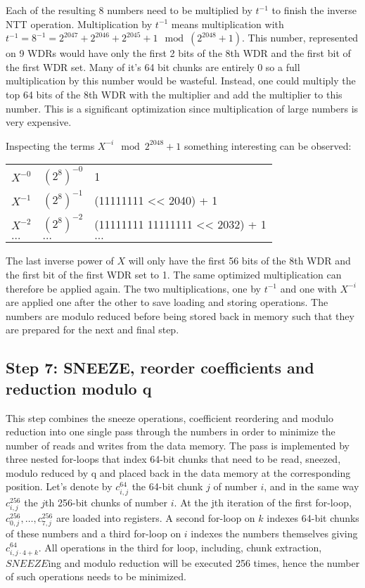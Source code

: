 Each of the resulting $8$ numbers need to be multiplied by $t^{-1}$ to finish the inverse NTT operation. Multiplication by $t^{-1}$ means multiplication with $t^{-1} = 8^{-1} = 2^{2047} + 2^{2046} + 2^{2045} + 1 \mod (2^{2048} + 1)$. This number, represented on 9 WDRs would have only the first 2 bits of the 8th WDR and the first bit of the first WDR set. Many of it's 64 bit chunks are entirely 0 so a full multiplication by this number would be wasteful. Instead, one could multiply the top 64 bits of the 8th WDR with the multiplier and add the multiplier to this number. This is a significant optimization since multiplication of large numbers is very expensive.

Inspecting the terms $X^{-i} \mod 2^{2048} + 1$ something interesting can be observed:

\begin{table*}[htpb]
    \caption[]{}
    \centering
    \begin{tabular}{l l l}
      \toprule
      \midrule
         $X^{-0}$ & $(2^8)^{-0}$  & 1 \\
         $X^{-1}$ & $(2^8)^{-1}$  & (11111111 << 2040) + 1 \\
         $X^{-2}$ & $(2^8)^{-2}$  & (11111111 11111111 << 2032) + 1 \\
         $\ldots$ & $\ldots$ & $\ldots$ \\
      \bottomrule
    \end{tabular}
  \end{table*}

The last inverse power of $X$ will only have the first 56 bits of the 8th WDR and the first bit of the first WDR set to 1. The same optimized multiplication can therefore be applied again. The two multiplications, one by $t^{-1}$ and one with $X^{-i}$ are applied one after the other to save loading and storing operations. The numbers are modulo reduced before being stored back in memory such that they are prepared for the next and final step.

\subsection{Step 7: SNEEZE, reorder coefficients and reduction modulo q}

This step combines the sneeze operations, coefficient reordering and modulo reduction into one single pass through the numbers in order to minimize the number of reads and writes from the data memory. The pass is implemented by three nested for-loops that index 64-bit chunks that need to be read, sneezed, modulo reduced by q and placed back in the data memory at the corresponding position. Let's denote by $c^{64}_{i, j}$ the 64-bit chunk $j$ of number $i$, and in the same way $c^{256}_{i, j}$ the $j$th 256-bit chunks of number $i$. At the jth iteration of the first for-loop, $c^{256}_{0, j}, \ldots, c^{256}_{7, j}$ are loaded into registers. A second for-loop on $k$ indexes 64-bit chunks of these numbers and a third for-loop on $i$ indexes the numbers themselves giving $c^{64}_{i, j \cdot 4 + k}$. All operations in the third for loop, including, chunk extraction, $SNEEZE$ing and modulo reduction will be executed 256 times, hence the number of such operations needs to be minimized. 

